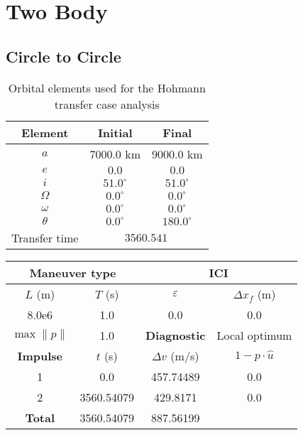 \section{Two Body}

\subsection{Circle to Circle}







\begin{table}[htbp]
    \centering
    \begin{tabular}{ccc} \toprule
        Element & Initial & Final \\ \midrule
        \(a\)      & \(7000.0\) km         & \(9000.0\) km   \\
        \(e\)      & \(0.0\)            & \(0.0\)        \\
        \(i\)      & \(51.0^\circ\)      & \(51.0^\circ\) \\
        \(\Omega\) & \(0.0^\circ\)   & \(0.0^\circ\)  \\
        \(\omega\) & \(0.0^\circ\)  & \(0.0^\circ\)  \\
        \(\theta\) & \(0.0^\circ\)  & \(180.0^\circ\)  \\ 
        Transfer time & \multicolumn{2}{c}{\(3560.541\)} \\\bottomrule
    \end{tabular}
    \caption{Orbital elements used for the Hohmann transfer case analysis}
    \label{tab:hohmann_orb_elems}
\end{table}










\begin{table}[htpb]
    \centering
    \begin{tabular}{cccc} \toprule
    \multicolumn{2}{c}{\textbf{Maneuver type}} & \multicolumn{2}{c}{ICI} \\ \midrule
    \(L\) (m) & \(T\) (s) & \(\varepsilon\) & \(\Delta x_{f}\) (m)    \\ \midrule
    8.0e6          & 1.0          & 0.0                & 0.0                        \\ \midrule
    \(\max \lVert p \rVert\) & 1.0     & \textbf{Diagnostic}   & Local optimum        \\ \midrule
    \textbf{Impulse} & \(t\) (s) & \(\Delta v\) (m/s) & \(1 - p \cdot \hat{u}\) \\ \midrule
    1                 & 0.0          & 457.74489             & 0.0                    \\
    2                 & 3560.54079          & 429.8171             & 0.0                    \\\midrule
    \textbf{Total}   & 3560.54079          & 887.56199             &                     \\ \bottomrule   
    \end{tabular}
\end{table}

